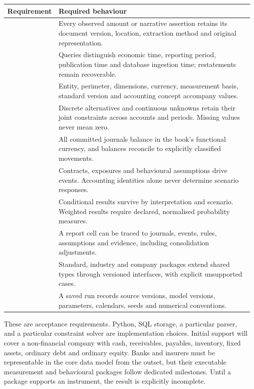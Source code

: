 \begin{longtable}{L{34mm}L{102mm}}
\toprule Requirement & Required behaviour\\\midrule\endhead
{} & Every observed amount or narrative assertion retains its
document version, location, extraction method and original representation.\\
 & Queries distinguish economic time, reporting period,
publication time and database ingestion time; restatements remain recoverable.\\
 & Entity, perimeter, dimensions, currency, measurement basis,
standard version and accounting concept accompany values.\\
 & Discrete alternatives and continuous unknowns retain their
joint constraints across accounts and periods. Missing values never mean zero.\\
 & All committed journals balance in the book's functional
currency, and balances reconcile to explicitly classified movements.\\
 & Contracts, exposures and behavioural assumptions drive
events. Accounting identities alone never determine scenario responses.\\
 & Conditional results survive by interpretation and scenario.
Weighted results require declared, normalised probability measures.\\
 & A report cell can be traced to journals, events, rules,
assumptions and evidence, including consolidation adjustments.\\
 & Standard, industry and company packages extend shared
types through versioned interfaces, with explicit unsupported cases.\\
 & A saved run records source versions, model versions,
parameters, calendars, seeds and numerical conventions.\\\bottomrule
\end{longtable}

These are acceptance requirements. Python, SQL storage, a particular parser,
and a particular constraint solver are implementation choices. Initial support
will cover a non-financial company with cash, receivables, payables, inventory,
fixed assets, ordinary debt and ordinary equity. Banks and insurers must be
representable in the core data model from the outset, but their executable
measurement and behavioural packages follow dedicated milestones. Until a
package supports an instrument, the result is explicitly incomplete.

